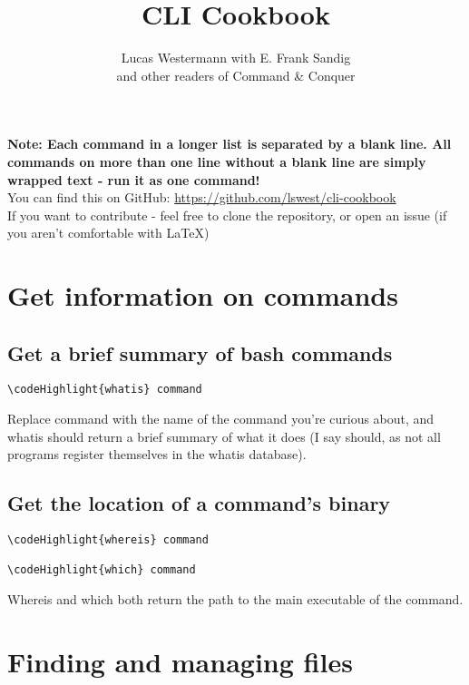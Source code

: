 \documentclass[12pt,a4paper]{article}
\begin{document}
\title{CLI Cookbook}
\author{Lucas Westermann with E. Frank Sandig \\ and other readers of Command \& Conquer}
\maketitle
\textbf{Note: Each command in a longer list is separated by a blank line.  All commands on more than one line without a blank line are simply wrapped text - run it as one command! } \\
You can find this on GitHub: \url{https://github.com/lswest/cli-cookbook}\\
If you want to contribute - feel free to clone the repository, or open an issue (if you aren't comfortable with LaTeX)
\pagebreak
\tableofcontents
\pagebreak

\newcommand\codeHighlight[1]{\textcolor[rgb]{1,0,0}{\textbf{#1}}}

\section{Get information on commands}
\label{Get information on commands}

\subsection{Get a brief summary of bash commands}
\begin{Verbatim}[commandchars=\\\{\}]
\codeHighlight{whatis} command
\end{Verbatim}
Replace command with the name of the command you're curious about, and whatis should return a brief summary of what it does (I say should, as not all programs register themselves in the whatis database).

\subsection{Get the location of a command's binary}
\begin{Verbatim}[commandchars=\\\{\}]
\codeHighlight{whereis} command

\codeHighlight{which} command
\end{Verbatim}
Whereis and which both return the path to the main executable of the command.

\section{Finding and managing files}
\label{Finding and managing files}
\end{document}
